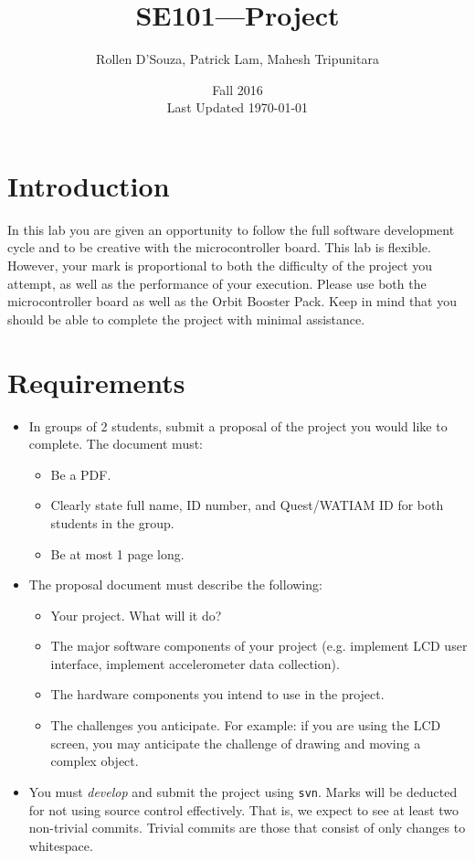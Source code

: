\documentclass{article}
\begin{document}
\title{SE101---Project}
\author{Rollen D'Souza, Patrick Lam, Mahesh Tripunitara}
\date{Fall 2016\\Last Updated \today}
\maketitle

\section*{Introduction}
In this lab you are given an opportunity to follow the full software development cycle and to be creative with the microcontroller board.  This lab is flexible. However, your mark is proportional to both the difficulty of the project you attempt, as well as the performance of your execution.  Please use both the microcontroller board as well as the Orbit Booster Pack.  Keep in mind that you should be able to complete the project with minimal assistance.

\section*{Requirements}
\begin{itemize}
	\item{In groups of 2 students, submit a proposal of the project you would like to complete. The document must:}
		\begin{itemize}
			\item Be a PDF.
			\item Clearly state full name, ID number, and Quest/WATIAM ID for both students in the group.
			\item Be at most 1 page long. 
		\end{itemize}
	\item{The proposal document must describe the following:}
		\begin{itemize}
			\item Your project. What will it do?
			\item The major software components of your project (e.g. implement LCD user interface, implement accelerometer data collection).
			\item The hardware components you intend to use in the project.
			\item The challenges you anticipate.  For example: if you are using the LCD screen, you may anticipate the challenge of drawing and moving a complex object.
		\end{itemize}
	\item{You must \emph{develop} and submit the project using \texttt{svn}.  Marks will be deducted for not using source control effectively.  That is, we expect to see at least two non-trivial commits.  Trivial commits are those that consist of only changes to whitespace.}

\end{itemize}
\end{document}
